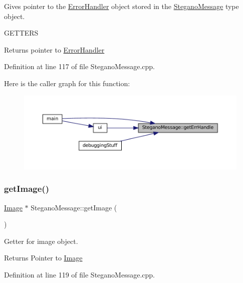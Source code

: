 Gives pointer to the \mbox{\hyperlink{classErrorHandler}{Error\+Handler}} object stored in the \mbox{\hyperlink{classSteganoMessage}{Stegano\+Message}} type object. 

G\+E\+T\+T\+E\+RS\begin{DoxyReturn}{Returns}
pointer to \mbox{\hyperlink{classErrorHandler}{Error\+Handler}} 
\end{DoxyReturn}


Definition at line 117 of file Stegano\+Message.\+cpp.

Here is the caller graph for this function\+:\nopagebreak
\begin{figure}[H]
\begin{center}
\leavevmode
\includegraphics[width=350pt]{classSteganoMessage_a0134757a8c79caa9dca9bcce0686d1ef_icgraph}
\end{center}
\end{figure}
\mbox{\label{classSteganoMessage_a2e3ad705a0219edfd2150f3f7931979c}} 
\subsubsection{\texorpdfstring{getImage()}{getImage()}}
{\footnotesize\ttfamily \mbox{\hyperlink{classImage}{Image}} $\ast$ Stegano\+Message\+::get\+Image (\begin{DoxyParamCaption}{ }\end{DoxyParamCaption})}



Getter for image object. 

\begin{DoxyReturn}{Returns}
Pointer to \mbox{\hyperlink{classImage}{Image}} 
\end{DoxyReturn}


Definition at line 119 of file Stegano\+Message.\+cpp.

